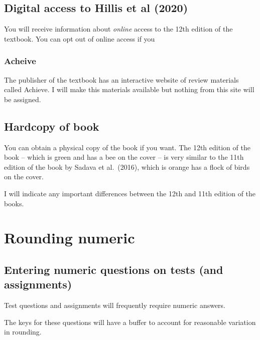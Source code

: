 \documentclass[
]{book}
\begin{document}
\hypertarget{digital-access-to-hillis-et-al-2020}{%
\section{Digital access to Hillis et al (2020)}\label{digital-access-to-hillis-et-al-2020}}

You will receive information about \emph{online} access to the 12th edition of the textbook. You can opt out of online access if you

\hypertarget{acheive-1}{%
\subsection{Acheive}\label{acheive-1}}

The publisher of the textbook has an interactive website of review materials called Achieve. I will make this materials available but nothing from this site will be assigned.

\hypertarget{hardcopy-of-book}{%
\section{Hardcopy of book}\label{hardcopy-of-book}}

You can obtain a physical copy of the book if you want. The 12th edition of the book -- which is green and has a bee on the cover -- is very similar to the 11th edition of the book by Sadava et al.~(2016), which is orange has a flock of birds on the cover.

I will indicate any important differences between the 12th and 11th edition of the books.

\hypertarget{rounding-numeric}{%
\chapter{Rounding numeric}\label{rounding-numeric}}

\hypertarget{entering-numeric-questions-on-tests-and-assignments}{%
\section{Entering numeric questions on tests (and assignments)}\label{entering-numeric-questions-on-tests-and-assignments}}

Test questions and assignments will frequently require numeric answers.

The keys for these questions will have a buffer to account for reasonable variation in rounding.
\end{document}
